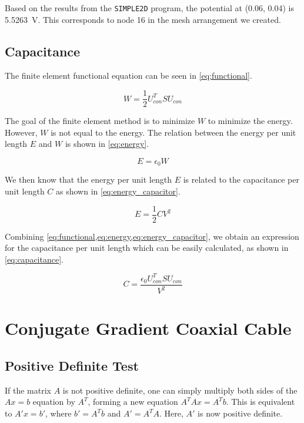 \documentclass[a4paper,titlepage]{article}
\begin{document}
	Based on the results from the \texttt{SIMPLE2D} program, the potential at (0.06, 0.04) is \SI{5.5263}{\volt}. This corresponds to node 16 in the mesh arrangement we created.
	
	\subsection{Capacitance}
	
	The finite element functional equation can be seen in \cref{eq:functional}.
	
	\begin{equation} \label{eq:functional}
		W = \frac{1}{2} U_{con}^T S U_{con}
	\end{equation}
	
	The goal of the finite element method is to minimize $W$ to minimize the energy. However, $W$ is not equal to the energy. The relation between the energy per unit length $E$ and $W$ is shown in \cref{eq:energy}.
	
	\begin{equation} \label{eq:energy}
		E = \epsilon_0 W
	\end{equation}
	
	We then know that the energy per unit length $E$ is related to the capacitance per unit length $C$ as shown in \cref{eq:energy_capacitor}.
	
	\begin{equation} \label{eq:energy_capacitor}
		E = \frac{1}{2} C V^2
	\end{equation}
	
	Combining \cref{eq:functional,eq:energy,eq:energy_capacitor}, we obtain an expression for the capacitance per unit length which can be easily calculated, as shown in \autoref{eq:capacitance}.
	
	\begin{equation} \label{eq:capacitance}
		C = \frac{\epsilon_0 U_{con}^T S U_{con}}{V^2}
	\end{equation}
	
	\section{Conjugate Gradient Coaxial Cable}
	
	\subsection{Positive Definite Test}
	
	If the matrix $A$ is not positive definite, one can simply multiply both sides of the $Ax = b$ equation by $A^T$, forming a new equation $A^TAx = A^Tb$. This is equivalent to $A'x = b'$, where $b' = A^Tb$ and $A' = A^TA$. Here, $A'$ is now positive definite.
	
\end{document}
